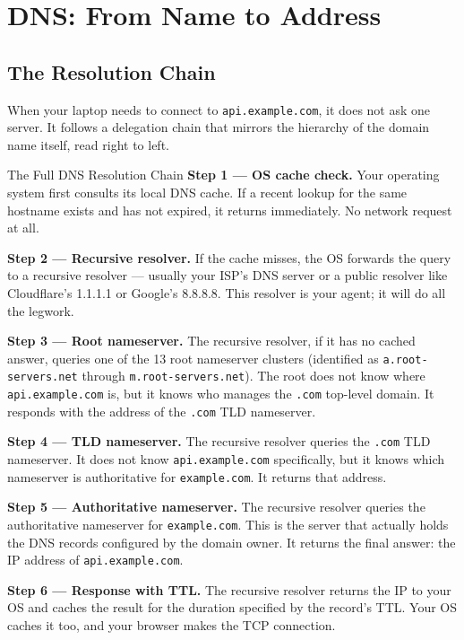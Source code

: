 \documentclass[11pt,a4paper]{article}
\begin{document}
\section{DNS: From Name to Address}

\subsection{The Resolution Chain}

When your laptop needs to connect to \texttt{api.example.com}, it does not ask one server. It follows a delegation chain that mirrors the hierarchy of the domain name itself, read right to left.

\begin{termbox}{The Full DNS Resolution Chain}
\textbf{Step 1 --- OS cache check.} Your operating system first consults its local DNS cache. If a recent lookup for the same hostname exists and has not expired, it returns immediately. No network request at all.

\textbf{Step 2 --- Recursive resolver.} If the cache misses, the OS forwards the query to a recursive resolver --- usually your ISP's DNS server or a public resolver like Cloudflare's 1.1.1.1 or Google's 8.8.8.8. This resolver is your agent; it will do all the legwork.

\textbf{Step 3 --- Root nameserver.} The recursive resolver, if it has no cached answer, queries one of the 13 root nameserver clusters (identified as \texttt{a.root-servers.net} through \texttt{m.root-servers.net}). The root does not know where \texttt{api.example.com} is, but it knows who manages the \texttt{.com} top-level domain. It responds with the address of the \texttt{.com} TLD nameserver.

\textbf{Step 4 --- TLD nameserver.} The recursive resolver queries the \texttt{.com} TLD nameserver. It does not know \texttt{api.example.com} specifically, but it knows which nameserver is authoritative for \texttt{example.com}. It returns that address.

\textbf{Step 5 --- Authoritative nameserver.} The recursive resolver queries the authoritative nameserver for \texttt{example.com}. This is the server that actually holds the DNS records configured by the domain owner. It returns the final answer: the IP address of \texttt{api.example.com}.

\textbf{Step 6 --- Response with TTL.} The recursive resolver returns the IP to your OS and caches the result for the duration specified by the record's TTL. Your OS caches it too, and your browser makes the TCP connection.
\end{termbox}
\end{document}
